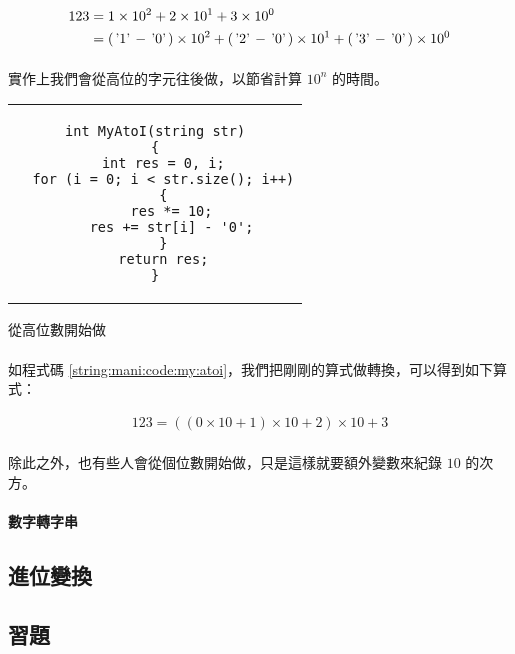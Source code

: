\documentclass[12pt,a4paper,oneside]{report}
\begin{document}
\begin{CJK}{UTF8}{bkai}
\begin{align*}
123&=1\times{{10}^2}+2\times{{10}^1}+3\times{{10}^0}\\
&=(\text{\lstinline!'1'!}-\text{\lstinline!'0'!})\times{{10}^2}+(\text{\lstinline!'2'!}-\text{\lstinline!'0'!})\times{{10}^1}+(\text{\lstinline!'3'!}-\text{\lstinline!'0'!})\times{{10}^0}
\end{align*}

\paragraph{}實作上我們會從高位的字元往後做，以節省計算 ${10}^n$ 的時間。

\begin{code}[h!]
  \centering
  \begin{tabular}{c}
  \begin{lstlisting}
int MyAtoI(string str)
{
  int res = 0, i;
  for (i = 0; i < str.size(); i++)
  {
    res *= 10;
    res += str[i] - '0';
  }
  return res;
}
  \end{lstlisting}
  \end{tabular}
  \caption{從高位數開始做}
  \label{string:mani:code:my:atoi}
\end{code}

\paragraph{}如程式碼 \ref{string:mani:code:my:atoi}，我們把剛剛的算式做轉換，可以得到如下算式：

\begin{align*}
123={({(0\times{10}+1)}\times{10}+2)}\times{10}+3
\end{align*}

\paragraph{}除此之外，也有些人會從個位數開始做，只是這樣就要額外變數來紀錄 $10$ 的次方。

\paragraph{數字轉字串}

\subsection{進位變換}

\subsection{習題}

\ifx \allfiles \undefined

\printindex

\clearpage
\end{CJK}
\end{document}
